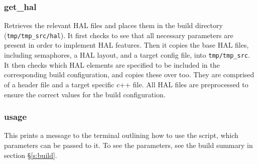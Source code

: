 \documentclass[a4paper, oneside, 11pt, titlepage, onecolumn, openright]{report}
\begin{document}
\subsubsection{get\_hal}
			\label{sss:buildGethal}
			Retrieves the relevant HAL files and places them in the build directory (\texttt{tmp/tmp\_src/hal}). It first checks to see that all necessary parameters are present in order to implement HAL features. Then it copies the base HAL files, including semaphores, a HAL layout, and a target config file, into \texttt{tmp/tmp\_src}. \newline
			It then checks which HAL elements are specified to be included in the corresponding build configuration, and copies these over too. They are comprised of a header file and a target specific c++ file. All HAL files are preprocessed to ensure the correct values for the build configuration.
			
\subsubsection{usage}
			\label{sss:buildUsage}
			This prints a message to the terminal outlining how to use the script, which parameters can be passed to it. To see the parameters, see the build summary in section \S\ref{s:build}. 

			
			
\end{document}
